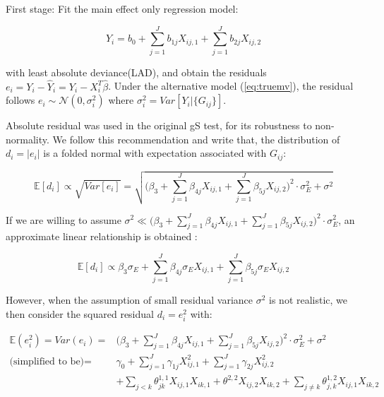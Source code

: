 \documentclass{article}
\begin{document}
First stage: Fit the main effect only regression model:

\begin{equation}
Y_i=b_0+\sum_{j=1}^J b_{1j}X_{ij,1}+\sum_{j=1}^J b_{2j}X_{ij,2}
\end{equation}

 with least absolute deviance(LAD), and obtain the residuals $e_i=Y_i-\widehat{Y}_i=Y_i-X_i^T\widehat{\beta}$. Under the alternative model (\ref{eq:truemv}), the residual follows $e_i\sim \mathcal{N}(0,\sigma_i^2)$ where $\sigma_i^2=Var[Y_i|\{G_{ij}\}]$.
 
Absolute residual was used in the original gS test, for its robustness to non-normality. We follow this recommendation and write that, the distribution of $d_i=|e_i|$ is a folded normal with expectation associated with $G_{ij}$:
 
    \begin{equation}
        \mathbb{E}[d_i]\propto\sqrt{Var[e_i]}=\sqrt{\Big(\beta_3+\sum_{j=1}^J\beta_{4j}X_{ij,1}+\sum_{j=1}^J\beta_{5j}X_{ij,2}\Big)^2\cdot \sigma^2_E+\sigma^2}
    \end{equation}
    
    If we are willing to assume $\sigma^2 \ll \Big(\beta_3+\sum_{j=1}^J\beta_{4j}X_{ij,1}+\sum_{j=1}^J\beta_{5j}X_{ij,2}\Big)^2\cdot \sigma^2_E$, an approximate linear relationship is obtained :
    
    \begin{equation}
    \mathbb{E}[d_i]\propto \beta_3 \sigma_E+\sum_{j=1}^J\beta_{4j}\sigma_E X_{ij,1}+\sum_{j=1}^J\beta_{5j}\sigma_EX_{ij,2}
    \end{equation}
    
However, when the assumption of small residual variance $\sigma^2$ is not realistic, we then consider the squared residual $d_i=e_i^2$ with:
    
    \begin{equation}
    \begin{split}
    \mathbb{E}(e_i^2) =Var(e_i)= & \Big(\beta_3+\sum_{j=1}^J\beta_{4j}X_{ij,1}+\sum_{j=1}^J\beta_{5j}X_{ij,2}\Big)^2\cdot \sigma^2_E+\sigma^2\\
     \text{(simplified to be)}= & \gamma_0+\sum_{j=1}^J \gamma_{1j}X^2_{ij,1}+\sum_{j=1}^J\gamma_{2j}X^2_{ij,2} \\
      & +\sum_{j< k}\theta^{1,1}_{jk}X_{ij,1}X_{ik,1} + \theta^{2,2}X_{ij,2}X_{ik,2}+\sum_{j\neq k} \theta^{1,2}_{j,k}X_{ij,1}X_{ik,2}
    \end{split}
    \end{equation}    
    
\end{document}

